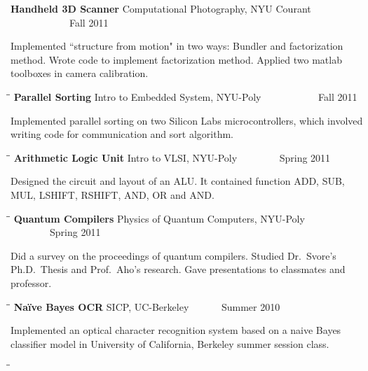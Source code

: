 \documentclass{res}
\begin{document}
\begin{resume}
\begin{tabbing}
    {\bf Handheld 3D Scanner} \>Computational Photography, NYU Courant\> ~~~~~~~~~~~~Fall 2011\\
   \end{tabbing}\vspace{-20pt}
    Implemented ``structure from motion" in two ways: Bundler and factorization method. Wrote code to implement factorization method. Applied two matlab toolboxes in camera calibration.
       \begin{tabbing}
   \hspace{2.3in}\= \hspace{2.6in}\= \kill %
    {\bf Parallel Sorting} \>Intro to Embedded System, NYU-Poly     \>~~~~~~~~~~~Fall 2011 \\
     \end{tabbing}\vspace{-20pt}      %
     Implemented parallel sorting on two Silicon Labs microcontrollers, which involved writing code for communication and sort algorithm.
   \begin{tabbing}%
   \hspace{2.3in}\= \hspace{2.6in}\= \kill %
   {\bf Arithmetic Logic Unit}  \>Intro to VLSI, NYU-Poly\> ~~~~~~~~Spring 2011\\
   \end{tabbing}\vspace{-20pt}
    Designed the circuit and layout of an ALU. It contained function ADD, SUB, MUL, LSHIFT, RSHIFT, AND, OR and AND.
      \begin{tabbing}%
   \hspace{2.3in}\= \hspace{2.6in}\= \kill %
   {\bf Quantum Compilers}  \>Physics of Quantum Computers, NYU-Poly\> ~~~~~~~~Spring 2011\\
   \end{tabbing}\vspace{-20pt}
    Did a survey on the proceedings of quantum compilers. Studied Dr.\ Svore's Ph.D.\ Thesis and Prof.\ Aho's research. Gave presentations to classmates and  professor.
      \begin{tabbing}%
   \hspace{2.3in}\= \hspace{2.6in}\= \kill %
   {\bf Na\"{i}ve Bayes OCR}  \>SICP, UC-Berkeley\> ~~~~~~Summer 2010\\
   \end{tabbing}\vspace{-20pt}
    Implemented an optical character recognition system based on a naive Bayes classifier model in University of California, Berkeley summer session class.
    \begin{tabbing}
   \hspace{2.3in}\= \hspace{2.6in}\= \kill %


\end{tabbing}
\end{resume}
\end{document}
